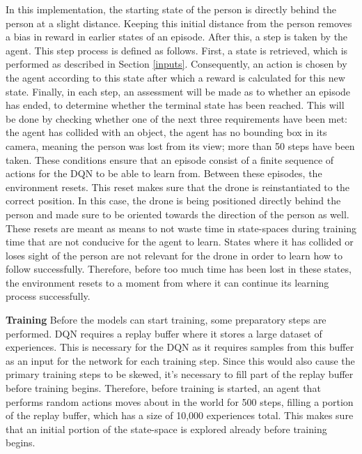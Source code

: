 In this implementation, the starting state of the person is directly behind the person at a 
slight distance. Keeping this initial distance from the person removes a bias in reward in 
earlier states of an episode. After this, a step is taken by the agent. This step process 
is defined as follows. First, a state is retrieved, which is performed as described in Section \ref{inputs}. 
Consequently, an action is chosen by the agent according to this state after 
which a reward is calculated for this new state. Finally, in each step, an assessment will be made as 
to whether an episode has ended, to determine whether the terminal state has been reached. 
This will be done by checking whether one of the next three requirements have been met: the agent 
has collided with an object, the agent has no bounding box in its camera, meaning the person was 
lost from its view; more than 50 steps have been taken. These conditions ensure that an episode 
consist of a finite sequence of actions for the DQN to be able to learn from. Between these episodes, 
the environment resets. This reset makes sure that the drone is reinstantiated 
to the correct position. In this case, the drone is being positioned directly behind the person and 
made sure to be oriented towards the direction of the person as well. These resets are meant as means 
to not waste time in state-spaces during training time that are not conducive for the agent to learn. 
States where it has collided or loses sight of the person are not relevant for the drone in order to 
learn how to follow successfully. Therefore, before too much time has been lost in these states, the 
environment resets to a moment from where it can continue its learning process successfully. \newline

\noindent
\textbf{Training} \newline  
Before the models can start training, some preparatory steps are performed. DQN requires a replay 
buffer where it stores a large dataset of 
experiences. This is necessary for the DQN as it requires samples from this buffer as an input 
for the network for each training step. Since this would also cause the primary training steps to be 
skewed, it's necessary to fill part of the replay buffer before training begins. Therefore, before training 
is started, an agent that performs random actions moves about in the world for 500 steps, filling 
a portion of the replay buffer, which has a size of 10,000 experiences total. This makes sure that an initial portion of the state-space 
is explored already before training begins.  


